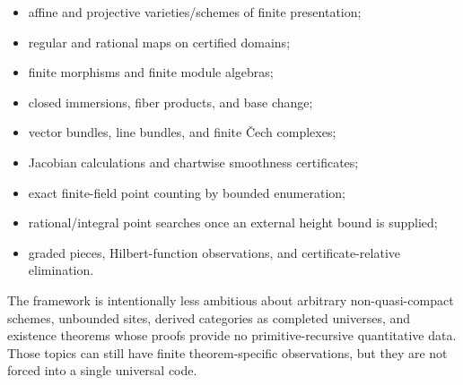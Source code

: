 \begin{itemize}
\item affine and projective varieties/schemes of finite presentation;
\item regular and rational maps on certified domains;
\item finite morphisms and finite module algebras;
\item closed immersions, fiber products, and base change;
\item vector bundles, line bundles, and finite \v{C}ech complexes;
\item Jacobian calculations and chartwise smoothness certificates;
\item exact finite-field point counting by bounded enumeration;
\item rational/integral point searches once an external height bound is supplied;
\item graded pieces, Hilbert-function observations, and certificate-relative elimination.
\end{itemize}

The framework is intentionally less ambitious about arbitrary non-quasi-compact schemes, unbounded
sites, derived categories as completed universes, and existence theorems whose proofs provide no
primitive-recursive quantitative data.  Those topics can still have finite theorem-specific
observations, but they are not forced into a single universal code.
